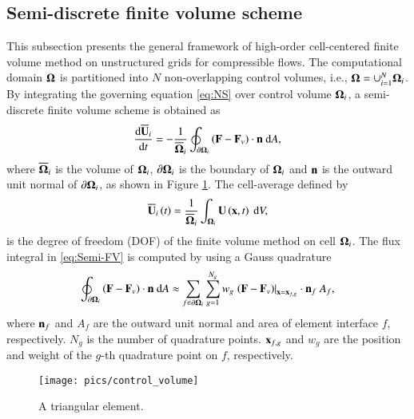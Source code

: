 \subsection{Semi-discrete finite volume scheme}
\label{ssec:FV}

This subsection presents the general framework of high-order cell-centered finite volume method on unstructured grids for compressible flows.
The computational domain $\mathbf{\Omega}$ is partitioned into $N$ non-overlapping control volumes, i.e., $\mathbf{\Omega}= \cup^N_{i=1}{\mathbf{\Omega}_i}$. By integrating the governing equation \eqref{eq:NS} over control volume $\mathbf{\Omega}_i$, a semi-discrete finite volume scheme is obtained as
\begin{equation}
    \label{eq:Semi-FV}
    \dfrac{ \dd\overline{\mathbf{U}}_i }{\dd t} = -\dfrac{1}{\overline{\mathbf{\Omega}}_i} \oint_{\partial \mathbf{\Omega}_i} \left(\mathbf{F} - \mathbf{F}_v \right) \cdot \mathbf{n} \ \dd A,
\end{equation}
where $\overline{\mathbf{\Omega}}_i$ is the volume of $\mathbf{\Omega}_i$, $\partial \mathbf{\Omega}_i$ is the boundary of $\mathbf{\Omega}_i$ and $\mathbf{n}$ is the outward unit normal of $\partial \mathbf{\Omega}_i$, as shown in Figure \ref{fig:controlvolume}. The cell-average defined by
\begin{equation}
    \label{eq:FVMean}
    \overline{\mathbf{U}}_i \left(t\right)= \frac{1}{\overline{\mathbf{\Omega}}_i}\int_{\mathbf{\Omega}_i}\mathbf{U} \left(\mathbf{x},t\right)\ \dd V,
\end{equation}
is the degree of freedom (DOF) of the finite volume method on cell $\mathbf{\Omega}_i$.
The flux integral in \eqref{eq:Semi-FV} is computed by using a Gauss quadrature
\begin{equation}
    \label{eq:Flux-Integral}
    \oint_{\partial \mathbf{\Omega}_i} \left(\mathbf{F} - \mathbf{F}_v \right) \cdot \mathbf{n} \ \dd A \approx \sum_{f \in \partial \mathbf{\Omega}_i} \sum_{g=1}^{N_g} w_g \left. \left(\mathbf{F} - \mathbf{F}_v \right)\right|_{\mathbf{x}=\mathbf{x}_{f,g}} \cdot \mathbf{n}_f \ A_f,
\end{equation}
where $\mathbf{n}_f$ and $A_f$ are the outward unit normal and area of element interface $f$, respectively. $N_g$ is the number of quadrature points. $\mathbf{x}_{f,g}$ and $w_g$ are the position and weight of the $g$-th quadrature point on $f$, respectively.

\begin{figure}[htbp!]
    \centering
    \texttt{[image: pics/control\_volume]}
    \caption{A triangular element.}
    \label{fig:controlvolume}
\end{figure}


